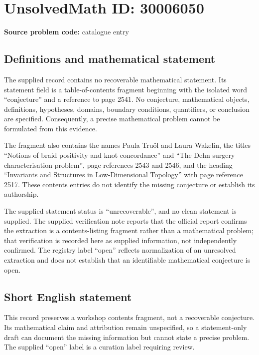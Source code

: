 \documentclass[11pt]{article}
\begin{document}
\section*{UnsolvedMath ID: 30006050}
\textbf{Source problem code:} catalogue entry
\subsection{Definitions and mathematical statement}
The supplied record contains no recoverable mathematical statement. Its statement field is a table-of-contents fragment beginning with the isolated word ``conjecture'' and a reference to page 2541. No conjecture, mathematical objects, definitions, hypotheses, domains, boundary conditions, quantifiers, or conclusion are specified. Consequently, a precise mathematical problem cannot be formulated from this evidence.

The fragment also contains the names Paula Truöl and Laura Wakelin, the titles ``Notions of braid positivity and knot concordance'' and ``The Dehn surgery characterisation problem'', page references 2543 and 2546, and the heading ``Invariants and Structures in Low-Dimensional Topology'' with page reference 2517. These contents entries do not identify the missing conjecture or establish its authorship.

The supplied statement status is ``unrecoverable'', and no clean statement is supplied. The supplied verification note reports that the official report confirms the extraction is a contents-listing fragment rather than a mathematical problem; that verification is recorded here as supplied information, not independently confirmed. The registry label ``open'' reflects normalization of an unresolved extraction and does not establish that an identifiable mathematical conjecture is open.
\subsection{Short English statement}
This record preserves a workshop contents fragment, not a recoverable conjecture. Its mathematical claim and attribution remain unspecified, so a statement-only draft can document the missing information but cannot state a precise problem. The supplied ``open'' label is a curation label requiring review.
\end{document}
